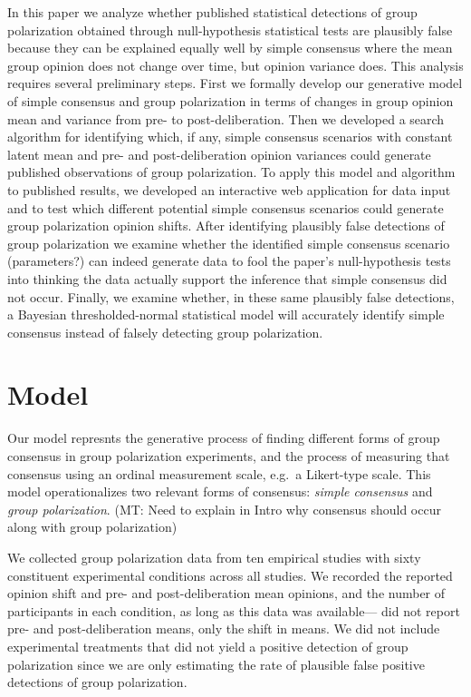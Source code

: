\documentclass[11pt, letterpaper]{article}
\newcommand{\mt}[1]{{\textcolor{myorange} {({\tiny MT:} #1)}}}
\begin{document}
In this paper we analyze whether published statistical detections of group 
polarization obtained through null-hypothesis statistical tests
are plausibly false because they can be explained equally well by simple consensus
where the mean group opinion does not change over time, but opinion variance does.
This analysis requires several preliminary steps. 
First we formally develop our generative model of simple consensus and group 
polarization in terms of changes in group opinion mean and variance from 
pre- to post-deliberation. Then we developed a search algorithm for identifying 
which, if any, simple consensus scenarios with 
constant latent mean and pre- and post-deliberation opinion variances 
could generate published observations of group polarization. To apply this model
and algorithm to published results, we developed an interactive web application
for data input and to test which different potential simple consensus scenarios 
could generate group polarization opinion shifts. After identifying plausibly false
detections of group polarization we examine whether the identified simple
consensus scenario (parameters?) can indeed generate data to fool the 
paper's null-hypothesis tests into thinking the data actually support the inference
that simple consensus did not occur. Finally, we examine whether, in these same
plausibly false detections, a Bayesian thresholded-normal statistical model
will accurately identify simple consensus instead of falsely detecting group
polarization.

\section{Model}

Our model represnts the generative process of finding different forms of group consensus
in group polarization experiments, and the process of measuring that consensus using
an ordinal measurement scale, e.g.\ a Likert-type scale. This model operationalizes two
relevant forms of consensus: \emph{simple consensus} and \emph{group polarization}.
\mt{Need to explain in Intro why consensus should occur along with group
polarization} 

We collected group polarization data from ten empirical studies with sixty constituent
experimental conditions across all studies. We recorded the reported opinion shift and pre- and
post-deliberation mean opinions, and the number of participants
in each condition, as long as this data was available--- 
did not report pre- and post-deliberation
means, only the shift in means. We did not include experimental treatments that did not 
yield a positive detection of group polarization since we are only estimating
the rate of plausible false positive detections of group polarization. 
\end{document}
